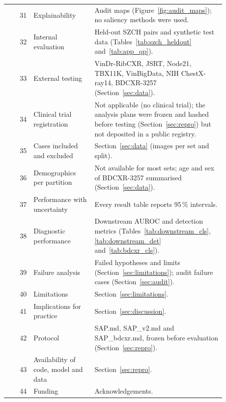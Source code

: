 {\begin{longtable}{@{}rp{0.28\linewidth}p{0.6\linewidth}@{}}
31 & Explainability & Audit maps (Figure~\ref{fig:audit_maps}); no saliency methods were used. \\
32 & Internal evaluation & Held-out SZCH pairs and synthetic test data (Tables~\ref{tab:szch_heldout} and~\ref{tab:app_qp}). \\
33 & External testing & VinDr-RibCXR, JSRT, Node21, TBX11K, VinBigData, NIH ChestX-ray14, BDCXR-3257 (Section~\ref{sec:data}). \\
34 & Clinical trial registration & Not applicable (no clinical trial); the analysis plans were frozen and hashed before testing (Section~\ref{sec:repro}) but not deposited in a public registry. \\
35 & Cases included and excluded & Section~\ref{sec:data} (images per set and split). \\
36 & Demographics per partition & Not available for most sets; age and sex of BDCXR-3257 summarised (Section~\ref{sec:data}). \\
37 & Performance with uncertainty & Every result table reports 95\,\% intervals. \\
38 & Diagnostic performance & Downstream AUROC and detection metrics (Tables~\ref{tab:downstream_cls}, \ref{tab:downstream_det} and~\ref{tab:bdcxr_cls}). \\
39 & Failure analysis & Failed hypotheses and limits (Section~\ref{sec:limitations}); audit failure cases (Section~\ref{sec:audit}). \\
40 & Limitations & Section~\ref{sec:limitations}. \\
41 & Implications for practice & Section~\ref{sec:discussion}. \\
42 & Protocol & SAP.md, SAP\_v2.md and SAP\_bdcxr.md, frozen before evaluation (Section~\ref{sec:repro}). \\
43 & Availability of code, model and data & Section~\ref{sec:repro}. \\
44 & Funding & Acknowledgements. \\
\bottomrule
\end{longtable}}

